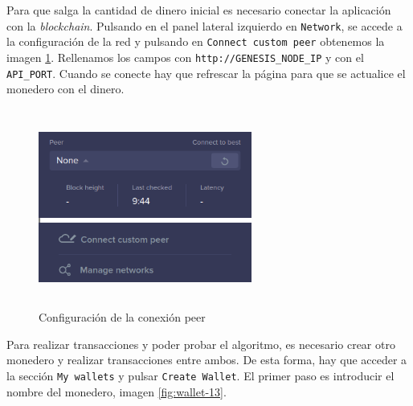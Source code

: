 Para que salga la cantidad de dinero inicial es necesario conectar la aplicación con la \textit{blockchain}. Pulsando en el panel lateral izquierdo en \texttt{Network}, se accede a la configuración de la red y pulsando en \texttt{Connect custom peer} obtenemos la imagen \ref{fig:wallet-11-12}. Rellenamos los campos con \texttt{http://GENESIS\_NODE\_IP} y con el \texttt{API\_PORT}. Cuando se conecte hay que refrescar la página para que se actualice el monedero con el dinero.

\begin{figure}[H]
	\centering
	\begin{minipage}{0.4\textwidth}
		\includegraphics[width=7cm,height=6.5cm]{figuras/wallet_11.png}
	\end{minipage}\hfill
	\begin{minipage}{0.4\textwidth}
	\end{minipage}
	\caption{Configuración de la conexión peer}
	\label{fig:wallet-11-12}
\end{figure}

\newpage
Para realizar transacciones y poder probar el algoritmo, es necesario crear otro monedero y realizar transacciones entre ambos. De esta forma, hay que acceder a la sección \texttt{My wallets} y pulsar \texttt{Create Wallet}. El primer paso es introducir el nombre del monedero, imagen \ref{fig:wallet-13}.
 

